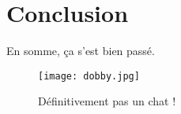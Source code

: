 \documentclass[../main.tex]{subfiles}
\begin{document}
\ifSubfilesClassLoaded{
}{}
\chapter{Conclusion}
En somme, ça s'est bien passé.

\begin{figure}[h]
    \centering
    \texttt{[image: dobby.jpg]}
    \caption{Définitivement pas un chat !}
    \label{fig:dobby}
\end{figure}
\ifSubfilesClassLoaded{%

    \printbibliography%
}{}
\end{document}
